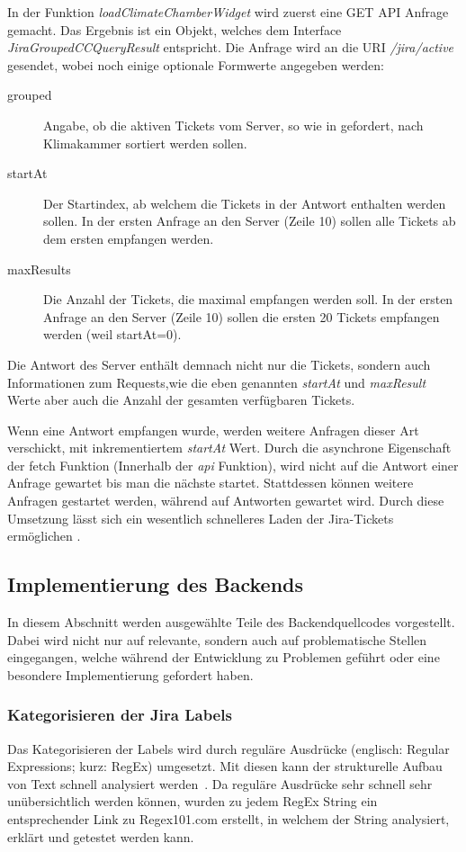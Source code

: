 In der Funktion \textit{loadClimateChamberWidget} wird zuerst eine GET API Anfrage gemacht.
Das Ergebnis ist ein Objekt, welches dem Interface \textit{JiraGroupedCCQueryResult} entspricht.
Die Anfrage wird an die \gls{URI} \textit{/jira/active} gesendet, wobei noch einige optionale 
Formwerte angegeben werden:

\begin{description}
    \item[grouped]
    Angabe, ob die aktiven Tickets vom Server, so wie in 
    gefordert, nach Klimakammer sortiert werden sollen.

    \item[startAt]
    Der Startindex, ab welchem die Tickets in der Antwort enthalten werden sollen. In der ersten 
    Anfrage an den Server (Zeile 10) sollen alle Tickets ab dem ersten empfangen werden.

    \item[maxResults]
    Die Anzahl der Tickets, die maximal empfangen werden soll. In der ersten 
    Anfrage an den Server (Zeile 10) sollen die ersten 20 Tickets empfangen werden (weil startAt=0).
\end{description}

Die Antwort des Server enthält demnach nicht nur die Tickets, sondern auch Informationen
zum Requests,wie die eben genannten \textit{startAt} und \textit{maxResult} Werte
aber auch die Anzahl der gesamten verfügbaren Tickets.

Wenn eine Antwort empfangen wurde, werden weitere Anfragen dieser Art verschickt, mit inkrementiertem \textit{startAt} Wert.
Durch die asynchrone Eigenschaft der fetch Funktion (Innerhalb der \textit{api} Funktion),
wird nicht auf die Antwort einer Anfrage gewartet bis man die nächste startet.
Stattdessen können weitere Anfragen gestartet werden, während auf Antworten gewartet wird.
Durch diese Umsetzung lässt sich ein wesentlich schnelleres Laden der Jira-Tickets ermöglichen .

\subsection{Implementierung des Backends}
In diesem Abschnitt werden ausgewählte Teile des Backendquellcodes vorgestellt.
Dabei wird nicht nur auf relevante, sondern auch auf problematische Stellen eingegangen,
welche während der Entwicklung zu Problemen geführt oder eine besondere 
Implementierung gefordert haben.

\subsubsection{Kategorisieren der Jira Labels}
Das Kategorisieren der Labels wird durch reguläre Ausdrücke (englisch: Regular 
Expressions; kurz: RegEx) umgesetzt. Mit diesen kann der strukturelle Aufbau 
von Text schnell analysiert werden~\cite{fitzgerald2012einstieg}. Da reguläre
Ausdrücke sehr schnell sehr unübersichtlich werden können, wurden zu jedem 
RegEx String ein entsprechender Link zu Regex101.com erstellt, in welchem der String
analysiert, erklärt und getestet werden kann.\\

